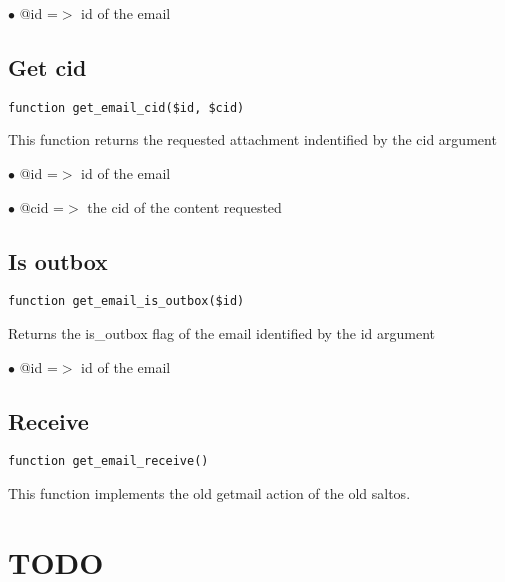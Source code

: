 \documentclass[a4paper]{book}
\begin{document}
\begin{compactitem}
\item[\color{myblue}$\bullet$] @id =$>$ id of the email
\end{compactitem}

\hypertarget{toc557}{}
\subsection{Get cid}

\begin{lstlisting}
function get_email_cid($id, $cid)
\end{lstlisting}

This function returns the requested attachment indentified by the cid argument

\begin{compactitem}
\item[\color{myblue}$\bullet$] @id  =$>$ id of the email
\item[\color{myblue}$\bullet$] @cid =$>$ the cid of the content requested
\end{compactitem}

\hypertarget{toc558}{}
\subsection{Is outbox}

\begin{lstlisting}
function get_email_is_outbox($id)
\end{lstlisting}

Returns the is\_outbox flag of the email identified by the id argument

\begin{compactitem}
\item[\color{myblue}$\bullet$] @id =$>$ id of the email
\end{compactitem}

\hypertarget{toc559}{}
\subsection{Receive}

\begin{lstlisting}
function get_email_receive()
\end{lstlisting}

This function implements the old getmail action of the old saltos.

\hypertarget{toc560}{}
\section{TODO}
\end{document}
